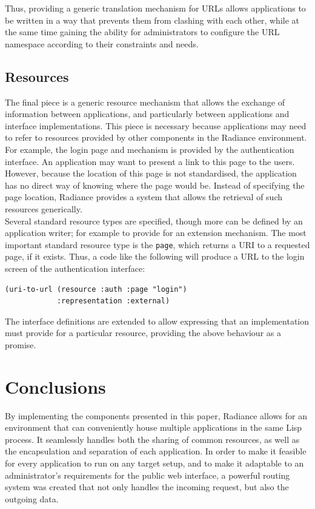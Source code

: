 \documentclass{sig-alternate}
\begin{document}
Thus, providing a generic translation mechanism for URLs allows applications to be written in a way that prevents them from clashing with each other, while at the same time gaining the ability for administrators to configure the URL namespace according to their constraints and needs. \\

\subsection{Resources}
The final piece is a generic resource mechanism that allows the exchange of information between applications, and particularly between applications and interface implementations. This piece is necessary because applications may need to refer to resources provided by other components in the Radiance environment. For example, the login page and mechanism is provided by the authentication interface. An application may want to present a link to this page to the users. However, because the location of this page is not standardised, the application has no direct way of knowing where the page would be. Instead of specifying the page location, Radiance provides a system that allows the retrieval of such resources generically. \\

Several standard resource types are specified, though more can be defined by an application writer; for example to provide for an extension mechanism. The most important standard resource type is the \texttt{page}, which returns a URI to a requested page, if it exists. Thus, a code like the following will produce a URL to the login screen of the authentication interface:

\begin{verbatim}
(uri-to-url (resource :auth :page "login")
            :representation :external)
\end{verbatim}

The interface definitions are extended to allow expressing that an implementation must provide for a particular resource, providing the above behaviour as a promise.

\section{Conclusions}
By implementing the components presented in this paper, Radiance allows for an environment that can conveniently house multiple applications in the same Lisp process. It seamlessly handles both the sharing of common resources, as well as the encapsulation and separation of each application. In order to make it feasible for every application to run on any target setup, and to make it adaptable to an administrator's requirements for the public web interface, a powerful routing system was created that not only handles the incoming request, but also the outgoing data. \\
\end{document}
